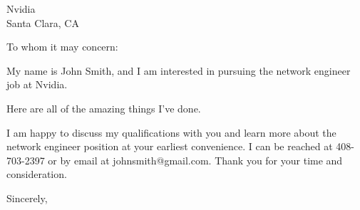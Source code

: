 \documentclass[11pt]{letter} %
\begin{document}

\begin{letter}{ Nvidia \\
Santa Clara, CA } 



\signature{John Smith} %


\opening{To whom it may concern:} 
 
My name is John Smith, and I am interested in pursuing the network engineer job at Nvidia.

Here are all of the amazing things I've done.

I am happy to discuss my qualifications with you and learn more about the network engineer 
position at your earliest convenience. I can be reached at 408-703-2397 or by email 
at johnsmith@gmail.com. Thank you for your time and consideration.

\closing{Sincerely,}




\end{letter}
\end{document}
